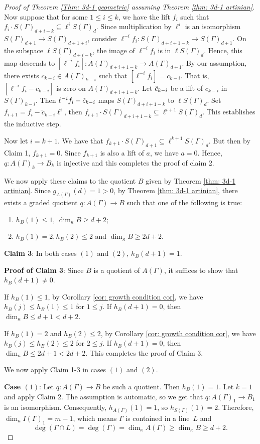 \documentclass[11pt]{amsart}
\theoremstyle{definition}
\newcommand{\sg}{S(\Gamma)}
\newcommand{\ag}{A(\Gamma)}
\newcommand{\dimk}{\dim_{\kappa}}
\newcommand{\Ag}{A(\Gamma)}
\begin{document}
\begin{proof}[Proof of Theorem \ref{Thm: 3d-1 geometric} assuming Theorem \ref{thm: 3d-1 artinian}]
Now suppose that for some $1 \leq i \leq k$, we have the lift $f_i$ such that $f_i\cdot \sg_{d+i-k} \subseteq \ell^{i} \sg_{d}$. Since multiplication by $\ell^{i}$ is an isomorphism $\sg_{d+1} \to \sg_{d+1+i}$, consider $\ell^{-i}f_i: \sg_{d+i+1-k} \to \sg_{d+1}$. On the subspace $\ell \sg_{d+i-k}$, the image of $\ell^{-i}f_i$ is in $\ell \sg_d$. Hence, this map descends to $[\ell^{-i}f_i]:\Ag_{d+i+1-k} \to \Ag_{d+1}$. By our assumption, there exists $c_{k-i} \in \Ag_{k-i}$ such that $[\ell^{-i}f_i]=c_{k-i}$. That is, $[\ell^{-i}f_i-c_{k-i}]$ is zero on $\Ag_{d+i+1-k}$. Let $\Tilde{c}_{k-i}$ be a lift of $c_{k-i}$ in $\sg_{k-i}$. Then $\ell^{-i}f_i-\Tilde{c}_{k-i}$ maps $\sg_{d+i+1-k}$ to $\ell\sg_d$. Set $f_{i+1}=f_i-\tilde{c}_{k-i}\ell^{i}$, then $f_{i+1} \cdot \sg_{d+i+1-k}\subseteq \ell^{i+1}\sg_d$. This establishes the inductive step.

Now let $i=k+1$. We have that $f_{k+1} \cdot \sg_{d+1} \subseteq \ell^{k+1}\sg_d$. But then by Claim 1, $f_{k+1}=0$. Since $f_{k+1}$ is also a lift of $a$, we have $a=0$. Hence, $q:A(\Gamma)_k \to B_k$ is injective and this completes the proof of claim 2. 

We now apply these claims to the quotient $B$ given by Theorem \ref{thm: 3d-1 artinian}. Since $g_{\ag}(d)=1>0$, by Theorem \ref{thm: 3d-1 artinian}, there exists a graded quotient $q: \Ag \to B$ such that one of the following is true:
\begin{enumerate}
    \item $h_B(1)\leq 1$, $\dimk B \geq d+2$;
    \item $h_B(1)=2, h_B(2) \leq 2$ and $\dimk B \geq 2d+2$.
\end{enumerate}
\noindent\textbf{Claim 3}: In both cases $(1)$ and $(2)$, $h_B(d+1)=1$.

\noindent\textbf{Proof of Claim 3}:
    Since $B$ is a quotient of $\ag$, it suffices to show that $h_B(d+1) \neq 0$.
    
    If $h_B(1) \leq 1$, by Corollary \ref{cor: growth condition cor}, we have $h_B(j) \leq h_B(1) \leq 1$ for $1 \leq j$. If $h_B(d+1)=0$, then $\dimk B \leq d+1<d+2$.

    If $h_B(1)=2$ and $h_B(2) \leq 2$, by Corollary \ref{cor: growth condition cor}, we have $h_B(j) \leq h_B(2) \leq 2$ for $2 \leq j$. If $h_B(d+1)=0$, then $\dimk B \leq 2d+1<2d+2$. This completes the proof of Claim 3.

We now apply Claim 1-3 in cases $(1)$ and $(2)$.

\noindent\textbf{Case $(1)$}: Let $q: \ag \to B$ be such a quotient. Then $h_B(1)=1$. Let $k=1$ and apply Claim 2. The assumption is automatic, so we get that $q: \Ag_1 \to B_1$ is an isomorphism. Consequently, $h_{\ag}(1)=1$, so $h_{\sg}(1)=2$. Therefore, $\dimk I(\Gamma)_1=m-1$, which means $\Gamma$ is contained in a line~$L$ and 
\[
\deg(\Gamma\cap L)=\deg(\Gamma)=\dimk A(\Gamma)\geq \dimk B\geq d+2.
\]


\end{proof}
\end{document}
